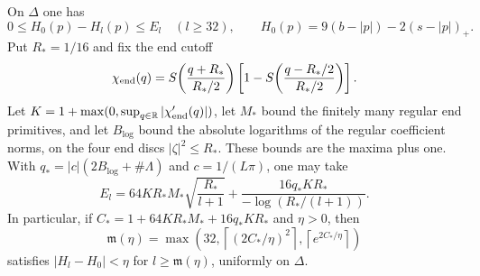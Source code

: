 \begin{proposition}\label{prop:sxm-bordered}
On $\Delta$ one has
\[
 0\le H_0(p)-H_l(p)\le E_l\quad(l\ge32),\qquad
 H_0(p)=9(b-|p|)-2(s-|p|)_+.
\]
Put $R_*=1/16$ and fix the end cutoff
\[
 \chi_{\rm end}(q)=S\!\left(\frac{q+R_*}{R_*/2}\right)
             \left[1-S\!\left(\frac{q-R_*/2}{R_*/2}\right)\right].
\]
Let $K=1+\max(0,\sup_{q\in\mathbb{R}}|\chi_{\rm end}'(q)|)$,
let $M_*$ bound the finitely many regular end primitives, and let $B_{\log}$ bound the
absolute logarithms of the regular coefficient norms, on the four end discs
$|\zeta|^2\le R_*$. These bounds are the maxima plus one.
With $q_*=|c|(2B_{\log}+\#\Lambda)$ and $c=1/(L\pi)$, one may take
\[
 E_l=64KR_*M_*\sqrt{\frac{R_*}{l+1}}
       +\frac{16q_*KR_*}{-\log(R_* /(l+1))}.
\]
In particular, if $C_*=1+64KR_*M_*+16q_*KR_*$ and $\eta>0$, then
\[
 \mathfrak m(\eta)=\max\left(32,\left\lceil(2C_*/\eta)^2\right\rceil,
                            \left\lceil e^{2C_*/\eta}\right\rceil\right)
\]
satisfies $|H_l-H_0|<\eta$ for $l\ge\mathfrak m(\eta)$, uniformly on $\Delta$.
\end{proposition}

